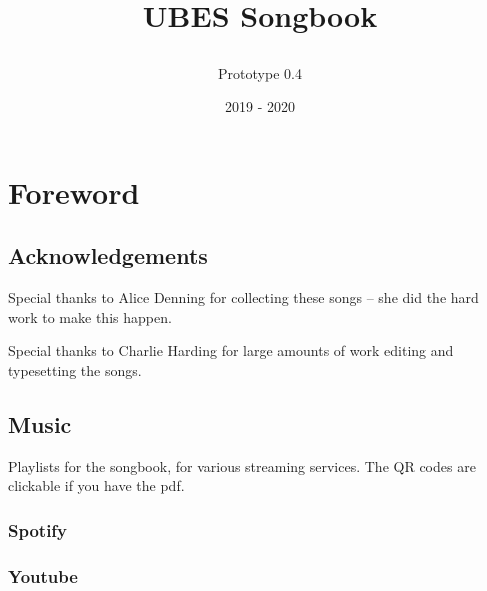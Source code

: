 \documentclass[9pt,twoside]{extarticle}
\title{
\centering
\def\svgwidth{0.4\textwidth}

\vspace{1in}
\\UBES Songbook}
\author{Prototype 0.4}
\date{2019 - 2020}
\newcommand{\sectionbreak}{\clearpage}
\begin{document}
\raggedbottom
{}


\maketitle
\newpage

\section*{Foreword}

\subsection*{Acknowledgements}

\begin{center}
Special thanks to Alice Denning for collecting these songs -- she did the hard
work to make this happen.

Special thanks to Charlie Harding for large amounts of work editing and
typesetting the songs.
\end{center}

\subsection*{Music}
\begin{center}

Playlists for the songbook, for various streaming services. The QR codes are
clickable if you have the pdf.

\subsubsection*{Spotify}
\quad
{}
\subsubsection*{Youtube}
\quad
{}


\end{center}
\newpage

\tableofcontents

\sectionbreak
{}
\end{document}
